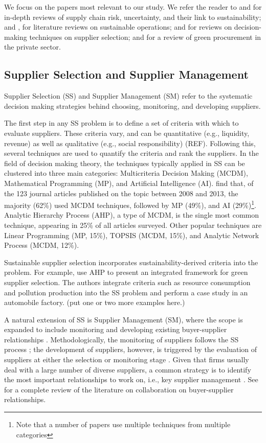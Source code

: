\documentclass[a4paper]{article}
\begin{document}
We focus on the papers most relevant to our study.
We refer the reader to \citet{Tang:2006} and \citet{Scholten:2017} for in-depth reviews of supply chain risk, uncertainty, and their link to sustainability; \citet{Jaehn:2016} and \citet{Tang:2012}, for literature reviews on sustainable operations; \citet{Ho:2010} and \citet{Chai:2013} for reviews on decision-making techniques on supplier selection; and \citet{Appolloni:2014} for a review of green procurement in the private sector. 



\subsection{Supplier Selection and Supplier Management}\label{lit:supp_select}
Supplier Selection (SS) and Supplier Management (SM) refer to the systematic decision making strategies behind choosing, monitoring, and developing suppliers.

The first step in any SS problem is to define a set of criteria with which to evaluate suppliers.
These criteria vary, and can be quantitative (e.g., liquidity, revenue) as well as qualitative (e.g., social responsibility) (REF). 
Following this, several techniques are used to quantify the criteria and rank the suppliers. 
In the field of decision making theory, the techniques typically applied in SS can be clustered into three main categories: Multicriteria Decision Making (MCDM), Mathematical Programming (MP), and Artificial Intelligence (AI).
\citet{Chai:2013} find that, of the 123 journal articles published on the topic between 2008 and 2013, the majority (62\%) used MCDM techniques, followed by MP (49\%), and AI (29\%)\footnote{Note that a number of papers use multiple techniques from multiple categories}. 
Analytic Hierarchy Process (AHP), a type of MCDM, is the single most common technique, appearing in 25\% of all articles surveyed.
Other popular techniques are Linear Programming (MP, 15\%), TOPSIS (MCDM, 15\%), and Analytic Network Process (MCDM, 12\%). 

Sustainable supplier selection incorporates sustainability-derived criteria into the problem.
For example, \citet{Hashemi:2013} use AHP to present an integrated framework for green supplier selection. 
The authors integrate criteria such as resource consumption and pollution production into the SS problem and perform a case study in an automobile factory. (put one or two more examples here.)

A natural extension of SS is Supplier Management (SM), where the scope is expanded to include monitoring and developing existing buyer-supplier relationships \citep{Modi:2007, Ivens:2013}.
Methodologically, the monitoring of suppliers follows the SS process \citep{Ittner:1999}; the development of suppliers, however, is triggered by the evaluation of suppliers at either the selection or monitoring stage \citep{Hahn:1990}.
Given that firms usually deal with a large number of diverse suppliers, a common strategy is to identify the most important relationships to work on, i.e., key supplier management \citep{Ivens:2009}. 
See \citet{Vijver:2009} for a complete review of the literature on collaboration on buyer-supplier relationships. 
\end{document}
